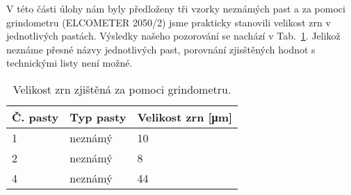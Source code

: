 V této části úlohy nám byly předloženy tři vzorky neznámých past a za pomoci grindometru (ELCOMETER 2050/2) jsme prakticky stanovili velikost zrn v jednotlivých pastách. 
Výsledky našeho pozorování se nachází v Tab.~\ref{tab:grindometr}. Jelikož neznáme přesné názvy jednotlivých past, porovnání zjisštěných hodnot s technickými listy není možné.

\begin{table}[h!]
    \caption{Velikost zrn zjištěná za pomoci grindometru.}
    \centering
    \def\arraystretch{1.4}
    \begin{tabular}{l|l|l}
        Č. pasty    & Typ pasty   & Velikost zrn [\unit{\micro\meter}]   \\ \hline
        1    & neznámý   & 10   \\ \hline
        2    & neznámý   &  8   \\ \hline
        4    & neznámý   & 44   \\ 
        \end{tabular}
    \label{tab:grindometr}
\end{table}